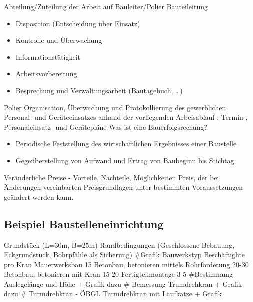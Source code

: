 Abteilung/Zuteilung der Arbeit auf Bauleiter/Polier\newline \newline
Bauteileitung
\begin{itemize}
\item Disposition (Entscheidung über Einsatz)
\item Kontrolle und Überwachung
\item Informationstätigkeit
\item Arbeitsvorbereitung
\item Besprechung und Verwaltungsarbeit (Bautagebuch, \dots)
\end{itemize}
Polier\newline\newline
Organisation, Überwachung und Protokollierung des gewerblichen Personal- und Geräteeinsatzes anhand der vorliegenden Arbeisablauf-, Termin-, Personaleinsatz- und Gerätepläne\newline\newline
Was ist eine Bauerfolgsrechung?
\begin{itemize}
\item Periodische Feststellung des wirtschaftlichen Ergebnisses einer Baustelle
\item Gegeüberstellung von Aufwand und Ertrag von Baubeginn bis Stichtag
\end{itemize}
Veränderliche Preise - Vorteile, Nachteile, Möglichkeiten\newline
Preis, der bei Änderungen vereinbarten Preisgrundlagen unter bestimmten Voraussetzungen geändert werden kann.\newline\newline
\subsection{Beispiel Baustelleneinrichtung}
Grundstück (L=30m, B=25m)\newline
Randbedingungen (Geschlossene Bebauung, Eckgrundstück, Bohrpfähle als Sicherung)\newline
#Grafik\newline\newline
Bauwerkstyp Beschäftighte pro Kran\newline
Mauerwerksbau 15\newline
Betonbau, betonieren mittels Rohrförderung 20-30\newline
Betonbau, betonieren mit Kran 15-20\newline
Fertigteilmontage 3-5\newline\newline
#Bestimmung Auslegelänge und Höhe + Grafik dazu \newline
# Bemessung Trumdrehkran + Grafik dazu \newline
# Turmdrehkran - ÖBGL Turmdrehkran mit Laufkatze + Grafik \newline
